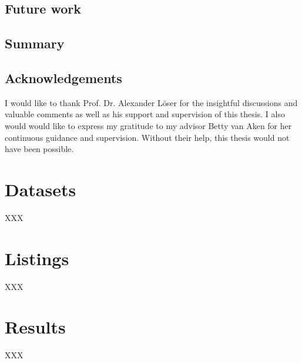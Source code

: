 \documentclass[11pt, a4paper]{book}
\begin{document}
\section{Future work}

\section{Summary}

\newpage

\section*{Acknowledgements}
I would like to thank Prof. Dr. Alexander Löser for the insightful discussions and valuable comments as well as his support and supervision of this thesis. I also would would like to express my gratitude to my advisor Betty van Aken for her continuous guidance and supervision. Without their help, this thesis would not have been possible.


\appendix
\renewcommand\chaptername{Appendix}

\chapter{Datasets}
XXX

\chapter{Listings}
XXX

\chapter{Results} 
XXX
\end{document}
